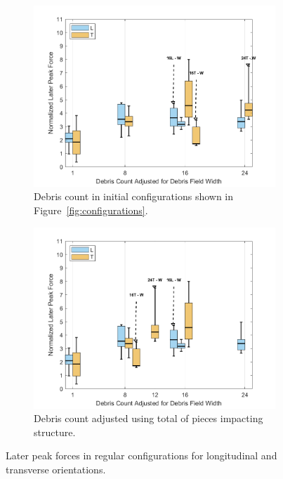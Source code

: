 \documentclass{article}
\begin{document}
\begin{figure}[htbp]
    \centering
    \begin{subfigure}[t]{0.9\textwidth}
        \centering
        \includegraphics[width=\textwidth]{LaterPeak_Regular_SplitByTrial.png}
        \caption{Debris count in initial configurations shown in Figure~\ref{fig:configurations}.}
        \label{fig:laterpeak_regular_original}
    \end{subfigure}
    \hfill
    \begin{subfigure}[t]{0.9\textwidth}
        \centering
        \includegraphics[width=\textwidth]{LaterPeak_Regular_RemappedT.png}
        \caption{Debris count adjusted using total of pieces impacting structure.}
        \label{fig:laterpeak_regular_remap}
    \end{subfigure}
    \caption{Later peak forces  in regular configurations for longitudinal and transverse orientations.}
    \label{fig:laterpeak_regular_split}
\end{figure}
\end{document}
